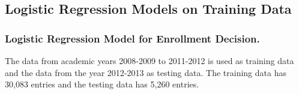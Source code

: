 \documentclass[12pt,english]{report}
\begin{document}

\subsection{Logistic Regression Models on Training Data }

\subsubsection{Logistic Regression Model for Enrollment Decision.} 

The data from academic years  2008-2009 to 2011-2012 is used as training data and the data from the  year 2012-2013 as testing data. The training data has 30,083 entries and the testing data has 5,260 entries. 
\end{document}
